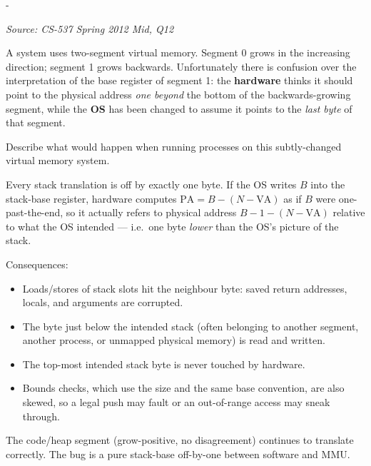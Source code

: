 \documentclass[11pt,a4paper]{article}
\makeatletter
\newcommand{\keepspace}[1]{\par\penalty-100\begingroup
  \setlength{\dimen@}{#1}\dimen@ii\pagegoal\advance\dimen@ii-\pagetotal
  \ifdim\dimen@>\dimen@ii\ifdim\dimen@ii>\z@\vfil\fi\break\fi\endgroup}
\newcounter{qn}[section]
\newenvironment{Qn}[4]{%
  \refstepcounter{qn}\keepspace{7\baselineskip}%
  \begin{tcolorbox}[qboxstyle, title={Q\thesection.\theqn\ \ [#1 \textbar\ #2]\ \ #4}]%
  {\footnotesize\color{g3}\textit{Source: #3}}\par\smallskip%
}{%
  \end{tcolorbox}%
}
\newenvironment{Sol}{%
  \begin{tcolorbox}[sboxstyle, title={Solution}]%
}{%
  \end{tcolorbox}\vspace{0.35em}%
}
\makeatother
\begin{document}
\begin{Qn}{Medium-Hard}{Lect 10}{CS-537 Spring 2012 Mid, Q12}{Hardware and OS disagree by one byte on the stack base}
A system uses two-segment virtual memory. Segment 0 grows in the
increasing direction; segment 1 grows backwards. Unfortunately there is
confusion over the interpretation of the base register of segment 1:
the \textbf{hardware} thinks it should point to the physical address
\emph{one beyond} the bottom of the backwards-growing segment, while
the \textbf{OS} has been changed to assume it points to the
\emph{last byte} of that segment.

Describe what would happen when running processes on this
subtly-changed virtual memory system.
\end{Qn}
\begin{Sol}
Every stack translation is off by exactly one byte. If the OS writes
$B$ into the stack-base register, hardware computes
$\mathrm{PA}=B-(N-\mathrm{VA})$ as if $B$ were one-past-the-end, so it
actually refers to physical address $B-1-(N-\mathrm{VA})$ relative to
what the OS intended --- i.e.\ one byte \emph{lower} than the OS's
picture of the stack.

Consequences:
\begin{itemize}
  \item Loads/stores of stack slots hit the neighbour byte: saved
        return addresses, locals, and arguments are corrupted.
  \item The byte just below the intended stack (often belonging to
        another segment, another process, or unmapped physical memory)
        is read and written.
  \item The top-most intended stack byte is never touched by hardware.
  \item Bounds checks, which use the size and the same base convention,
        are also skewed, so a legal push may fault or an out-of-range
        access may sneak through.
\end{itemize}
The code/heap segment (grow-positive, no disagreement) continues to
translate correctly. The bug is a pure stack-base off-by-one between
software and MMU.
\end{Sol}
\end{document}
